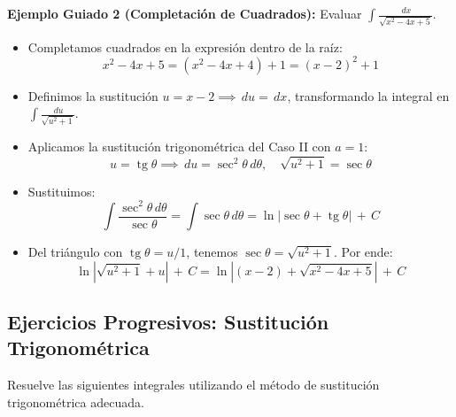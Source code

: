 \documentclass[12pt, letterpaper]{article}
\newcommand{\dx}{\,dx}
\newcommand{\du}{\,du}
\newcommand{\dtheta}{\,d\theta}
\newcommand{\CC}{\,+\,C}
\DeclareMathOperator{\tg}{tg}
\begin{document}
\vspace{4pt}
\noindent\textbf{Ejemplo Guiado 2 (Completación de Cuadrados):} Evaluar $\int \frac{\dx}{\sqrt{x^2-4x+5}}$.
\begin{itemize}
  \item Completamos cuadrados en la expresión dentro de la raíz:
    $$x^2 - 4x + 5 = (x^2 - 4x + 4) + 1 = (x-2)^2 + 1$$
  \item Definimos la sustitución $u = x-2 \implies \du = \dx$, transformando la integral en $\int \frac{\du}{\sqrt{u^2+1}}$.
  \item Aplicamos la sustitución trigonométrica del Caso II con $a = 1$:
    $$u = \tg\theta \implies \du = \sec^2\theta\dtheta, \quad \sqrt{u^2+1} = \sec\theta$$
  \item Sustituimos:
    $$\int \frac{\sec^2\theta\dtheta}{\sec\theta} = \int \sec\theta\dtheta = \ln|\sec\theta + \tg\theta| \CC$$
  \item Del triángulo con $\tg\theta = u/1$, tenemos $\sec\theta = \sqrt{u^2+1}$. Por ende:
    $$\ln|\sqrt{u^2+1} + u| \CC = \ln|(x-2) + \sqrt{x^2-4x+5}| \CC$$
\end{itemize}

\newpage

\subsection{Ejercicios Progresivos: Sustitución Trigonométrica}
Resuelve las siguientes integrales utilizando el método de sustitución trigonométrica adecuada.
\end{document}
